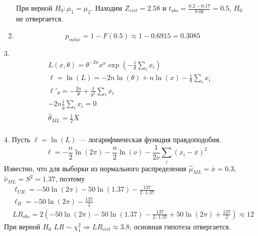 \begin{enumerate}
\begin{enumerate}
При верной $H_0: \mu_1=\mu_2$.
Находим $Z_{crit} = 2.58$ и $t_{obs} =\frac{0.2-0.17}{0.06}= 0.5$, $H_0$ не отвергается.
\item
\[
p_{value} = 1 - F(0.5) \approx 1 - 0.6915 = 0.3085
\]
\end{enumerate}

\item[3.]
\begin{align*}
&L(x, \theta) = \theta^{-2n} x^n \exp \left(-\frac{1}{\theta}\sum_ix_i\right) \\
&\ell=\ln(L)=-2n\ln(\theta)+n\ln(x)-\frac{1}{\theta}\sum_ix_i \\
&\ell'_{\theta}=-\frac{2n}{\theta} + \frac{1}{\theta^2}\sum_ix_i \\
&-2n\frac{1}{\hat{\theta}}\sum_ix_i=0 \\
&\hat{\theta}_{ML}=\frac{1}{2}\bar{X} \\
\end{align*}


\item[4.]
Пусть $\ell=\ln(L)$ — логарифмическая функция правдоподобия.
\[
\ell=-\frac{n}{2}\ln(2\pi)-\frac{n}{2}\ln(\nu)-\frac{1}{2\nu}\sum_i(x_i-\bar{x})^2
\]
Известно, что для выборки из нормального распределения
$\hat{\mu}_{ML} = \bar{x} = 0.3$, $\hat{\nu}_{ML} = S^2 = 1.37$, поэтому
\begin{align*}
&\ell_{UR} = -50\ln(2\pi) - 50\ln(1.37)-\frac{137}{2 \cdot 1.37} \\
&\ell_{R} = -50\ln(2\pi) - \frac{137}{2} \\
& LR_{obs}=2\left(-50\ln(2\pi)-50\ln(1.37)-\frac{137}{2\cdot1.37}+50\ln(2\pi)+\frac{137}{2}\right) \approx 12
\end{align*}
При верной $H_0$ $LR\sim\chi^2_1 \Rightarrow LR_{crit}\approx3.8$, основная гипотеза отвергается.


\end{enumerate}

